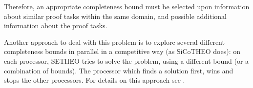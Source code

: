 Therefore, an appropriate completeness bound must be selected upon information
about similar proof tasks within the same domain, and possible additional
information about the proof tasks.

Another approach to deal with this problem is to explore several different
completeness bounds in parallel in a competitive way (as SiCoTHEO does):
on each processor, SETHEO tries to solve the problem, using a different
bound (or a combination of bounds). The processor which finds a solution
first, wins and stops the other processors.
For details on this approach see \cite{Sch96ppai}.

